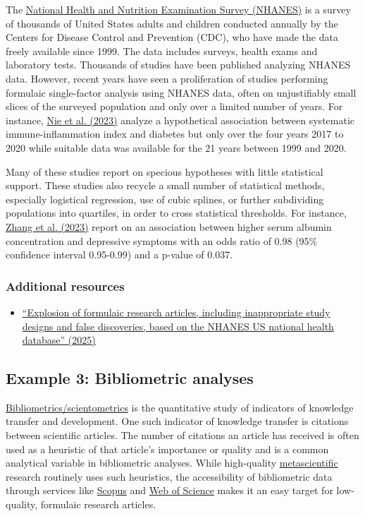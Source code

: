\documentclass[letterpaper, 12pt]{article}
\begin{document}
The \href{https://www.cdc.gov/nchs/nhanes/index.html}{National Health and Nutrition Examination Survey (NHANES)} is a survey of thousands of United States adults and children conducted annually by the Centers for Disease Control and Prevention (CDC), who have made the data freely available since 1999. The data includes surveys, health exams and laboratory tests. Thousands of studies have been published analyzing NHANES data. However, recent years have seen a proliferation of studies performing formulaic single-factor analysis using NHANES data, often on unjustifiably small slices of the surveyed population and only over a limited number of years. For instance, \href{https://doi.org/10.3389/fendo.2023.1245199}{Nie et al. (2023)} analyze a hypothetical association between systematic immune-inflammation index and diabetes but only over the four years 2017 to 2020 while suitable data was available for the 21 years between 1999 and 2020.

Many of these studies report on specious hypotheses with little statistical support. These studies also recycle a small number of statistical methods, especially logistical regression, use of cubic splines, or further subdividing populations into quartiles, in order to cross statistical thresholds. For instance, \href{https://doi.org/10.1186/s12888-023-04935-1}{Zhang et al. (2023)} report on an association between higher serum albumin concentration and depressive symptoms with an odds ratio of 0.98 (95\% confidence interval 0.95-0.99) and a p-value of 0.037.

\subsubsection*{Additional resources}

\begin{itemize}
    \setlength\itemsep{-0.5em}
    \item \href{https://doi.org/10.1371/journal.pbio.3003152}{``Explosion of formulaic research articles, including inappropriate study designs and false discoveries, based on the NHANES US national health database'' (2025)}
\end{itemize}

\subsection*{Example 3: Bibliometric analyses}

\href{https://en.wikipedia.org/wiki/Bibliometrics}{Bibliometrics/scientometrics} is the quantitative study of indicators of knowledge transfer and development. One such indicator of knowledge transfer is citations between scientific articles. The number of citations an article has received is often used as a heuristic of that article's importance or quality and is a common analytical variable in bibliometric analyses. While high-quality \href{https://en.wikipedia.org/wiki/Metascience}{metascientific} research routinely uses such heuristics, the accessibility of bibliometric data through services like \href{https://scopus.com}{Scopus} and \href{/https://webofscience.com/}{Web of Science} makes it an easy target for low-quality, formulaic research articles. 
\end{document}
